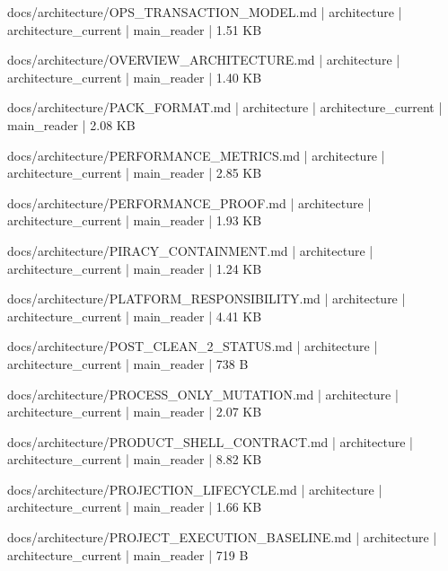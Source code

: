 \documentclass[11pt,a4paper]{report}
\begin{document}
{\small\ttfamily\raggedright docs/\allowbreak{}architecture/\allowbreak{}OPS\_TRANSACTION\_MODEL.\allowbreak{}md | architecture | architecture\_current | main\_reader | 1.\allowbreak{}51 KB\par}
{\small\ttfamily\raggedright docs/\allowbreak{}architecture/\allowbreak{}OVERVIEW\_ARCHITECTURE.\allowbreak{}md | architecture | architecture\_current | main\_reader | 1.\allowbreak{}40 KB\par}
{\small\ttfamily\raggedright docs/\allowbreak{}architecture/\allowbreak{}PACK\_FORMAT.\allowbreak{}md | architecture | architecture\_current | main\_reader | 2.\allowbreak{}08 KB\par}
{\small\ttfamily\raggedright docs/\allowbreak{}architecture/\allowbreak{}PERFORMANCE\_METRICS.\allowbreak{}md | architecture | architecture\_current | main\_reader | 2.\allowbreak{}85 KB\par}
{\small\ttfamily\raggedright docs/\allowbreak{}architecture/\allowbreak{}PERFORMANCE\_PROOF.\allowbreak{}md | architecture | architecture\_current | main\_reader | 1.\allowbreak{}93 KB\par}
{\small\ttfamily\raggedright docs/\allowbreak{}architecture/\allowbreak{}PIRACY\_CONTAINMENT.\allowbreak{}md | architecture | architecture\_current | main\_reader | 1.\allowbreak{}24 KB\par}
{\small\ttfamily\raggedright docs/\allowbreak{}architecture/\allowbreak{}PLATFORM\_RESPONSIBILITY.\allowbreak{}md | architecture | architecture\_current | main\_reader | 4.\allowbreak{}41 KB\par}
{\small\ttfamily\raggedright docs/\allowbreak{}architecture/\allowbreak{}POST\_CLEAN\_2\_STATUS.\allowbreak{}md | architecture | architecture\_current | main\_reader | 738 B\par}
{\small\ttfamily\raggedright docs/\allowbreak{}architecture/\allowbreak{}PROCESS\_ONLY\_MUTATION.\allowbreak{}md | architecture | architecture\_current | main\_reader | 2.\allowbreak{}07 KB\par}
{\small\ttfamily\raggedright docs/\allowbreak{}architecture/\allowbreak{}PRODUCT\_SHELL\_CONTRACT.\allowbreak{}md | architecture | architecture\_current | main\_reader | 8.\allowbreak{}82 KB\par}
{\small\ttfamily\raggedright docs/\allowbreak{}architecture/\allowbreak{}PROJECTION\_LIFECYCLE.\allowbreak{}md | architecture | architecture\_current | main\_reader | 1.\allowbreak{}66 KB\par}
{\small\ttfamily\raggedright docs/\allowbreak{}architecture/\allowbreak{}PROJECT\_EXECUTION\_BASELINE.\allowbreak{}md | architecture | architecture\_current | main\_reader | 719 B\par}
\end{document}
